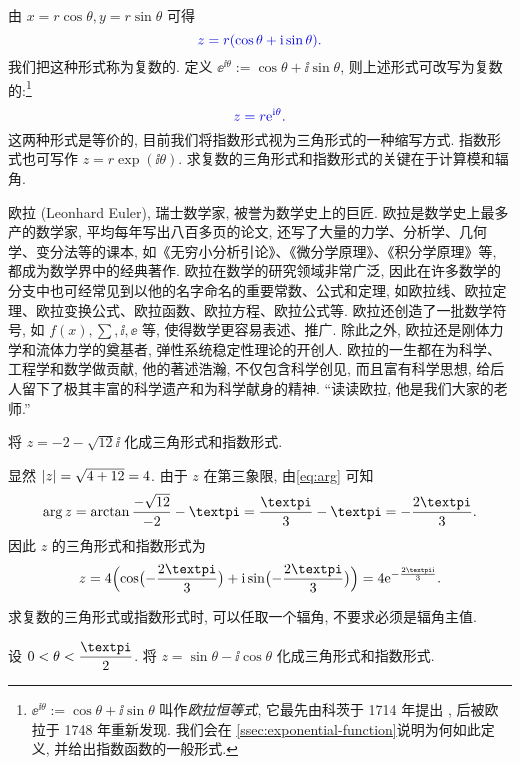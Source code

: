 由 $x=r\cos\theta,y=r\sin\theta$ 可得
\[
  \color{main}z=r(\cos\theta+\ii\sin\theta).
\]
我们把这种形式称为复数的.
定义 \alert{$\ee^{\ii\theta}:=\cos\theta+\ii\sin\theta$}, 则上述形式可改写为复数的:\footnote{%
  $\ee^{\ii\theta}:=\cos\theta+\ii\sin\theta$ 叫作\emph{欧拉恒等式}, 它最先由科茨于 1714 年提出 \cite[第19章3节]{Kline1990b}, 后被欧拉于 1748 年重新发现.
  我们会在 \ref{ssec:exponential-function}说明为何如此定义, 并给出指数函数的一般形式.
}
\[
  \color{main}z=r\ee^{\ii\theta}.
\]
这两种形式是等价的, 目前我们将指数形式视为三角形式的一种缩写方式.
指数形式也可写作 $z=r\exp(\ii\theta)$.
求复数的三角形式和指数形式的\alert{关键在于计算模和辐角}.

\begin{people}
  欧拉 (Leonhard Euler), 瑞士数学家, 被誉为数学史上的巨匠.
  欧拉是数学史上最多产的数学家, 平均每年写出八百多页的论文, 还写了大量的力学、分析学、几何学、变分法等的课本, 如《无穷小分析引论》、《微分学原理》、《积分学原理》等, 都成为数学界中的经典著作.
  欧拉在数学的研究领域非常广泛, 因此在许多数学的分支中也可经常见到以他的名字命名的重要常数、公式和定理, 如欧拉线、欧拉定理、欧拉变换公式、欧拉函数、欧拉方程、欧拉公式等.
  欧拉还创造了一批数学符号, 如 $f(x), \sum,\ii,\ee$ 等, 使得数学更容易表述、推广.
  除此之外, 欧拉还是刚体力学和流体力学的奠基者, 弹性系统稳定性理论的开创人.
  欧拉的一生都在为科学、工程学和数学做贡献, 他的著述浩瀚, 不仅包含科学创见, 而且富有科学思想, 给后人留下了极其丰富的科学遗产和为科学献身的精神. ``读读欧拉, 他是我们大家的老师.''
\end{people}

\begin{example}
  将 $z=-2-\sqrt{12}\ii$ 化成三角形式和指数形式.
\end{example}

\begin{solution}
  显然 $\lvert z\rvert=\sqrt{4+12}=4$.
  由于 $z$ 在第三象限, 由\eqref{eq:arg} 可知
  \[
     \arg z
    =\arctan\frac{-\sqrt{12}}{-2}-\cpi
    =\frac\cpi3-\cpi
    =-\frac{2\cpi}3.
  \]
  因此 $z$ 的三角形式和指数形式为
  \[
     z
    =4\Bigl(\cos\bigl(-\frac{2\cpi}3\bigr)+\ii\sin\bigl(-\frac{2\cpi}3\bigr)\Bigr)
    =4\ee^{-\frac{2\cpi \ii}3}.
  \]
\end{solution}

求复数的三角形式或指数形式时, 可以任取一个辐角, 不要求必须是辐角主值.

\begin{example}
  设 $0<\theta<\dfrac\cpi2$.
  将 $z=\sin\theta-\ii\cos\theta$ 化成三角形式和指数形式.
\end{example}

